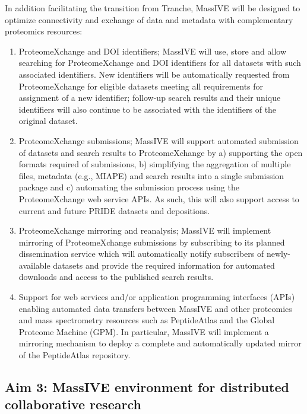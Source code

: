 \documentclass[arial,11pt]{article}
\begin{document}
In addition facilitating the transition from Tranche, MassIVE will be designed to optimize connectivity and exchange of data and metadata with complementary proteomics resources:

\begin{enumerate}
\item ProteomeXchange and DOI identifiers; MassIVE will use, store and allow searching for ProteomeXchange and DOI identifiers for all datasets with such associated identifiers. New identifiers will be automatically requested from ProteomeXchange for eligible datasets meeting all requirements for assignment of a new identifier; follow-up search results and their unique identifiers will also continue to be associated with the identifiers of the original dataset.

\item ProteomeXchange  submissions; MassIVE will support automated submission of datasets and search results to ProteomeXchange by a) supporting the open formats required of submissions, b) simplifying the aggregation of multiple files, metadata (e.g., MIAPE) and search results into a single submission package and c) automating the submission process using the ProteomeXchange web service APIs. As such, this will also support access to current and future PRIDE datasets and depositions.

\item ProteomeXchange mirroring and reanalysis; MassIVE will implement mirroring of ProteomeXchange submissions by subscribing to its planned dissemination service which will automatically notify subscribers of newly-available datasets and provide the required information for automated downloads and access to the published search results.

\item Support for web services and/or application programming interfaces (APIs) enabling automated data transfers between MassIVE and other proteomics and mass spectrometry resources such as PeptideAtlas and the Global Proteome Machine (GPM). In particular, MassIVE will implement a mirroring mechanism to deploy a complete and automatically updated mirror of the PeptideAtlas repository.
\end{enumerate}


\subsection{Aim 3: MassIVE environment for distributed collaborative research}
\end{document}
